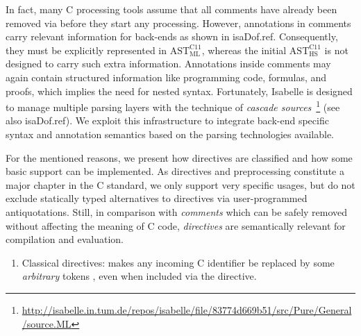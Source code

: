 \begin{isabellebody}
\begin{isamarkuptext}
In fact, many C processing tools assume that all comments have already been removed via
 before they start any processing. However, annotations in comments carry relevant information 
for back-ends as shown in  \csname isaDof.ref. Consequently, they must be explicitly 
represented in $\text{AST}^{\text{C11}}_{\text{ML}}$,
whereas the initial $\text{AST}^{\text{C11}}_{\text{HS}}$ 
is not designed to carry such extra information. 
Annotations inside comments may again contain structured information like programming code, formulas,
and proofs, which implies the need for nested syntax. Fortunately, Isabelle is designed to
manage multiple parsing layers with the technique of \emph{cascade sources}~\footnote{\url{http://isabelle.in.tum.de/repos/isabelle/file/83774d669b51/src/Pure/General/source.ML}}
(see also \csname isaDof.ref). We exploit this infrastructure to integrate
back-end specific syntax and annotation semantics based on the parsing technologies available.%
\end{isamarkuptext}\isamarkuptrue%
%
\isadelimdocument
%
\endisadelimdocument
%
\isatagdocument
%
\isamarkuptrue%
%
\endisatagdocument
{\isafolddocument}%
%
\isadelimdocument
%
\endisadelimdocument
%
\begin{isamarkuptext}%
For the mentioned reasons, we present how directives are classified and how some basic
support can be implemented. As directives and preprocessing constitute a major chapter in the C
standard, we only support very specific usages, but do not exclude statically typed alternatives to
directives via user-programmed antiquotations. Still, in comparison with
\emph{comments} which can be safely removed without affecting the meaning of C code,
\emph{directives} are semantically relevant for compilation and evaluation.

%
\begin{enumerate}%
\item Classical directives:  makes any incoming C identifier
 be replaced by some \emph{arbitrary} tokens ,
even when included via the  directive.


\end{enumerate}
\end{isamarkuptext}
\end{isabellebody}
